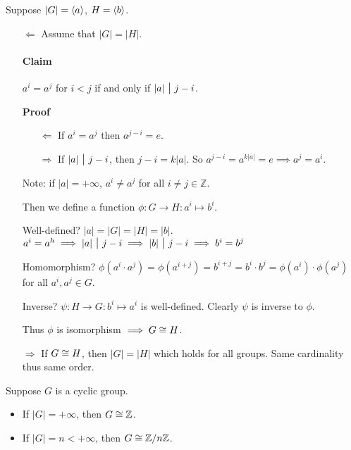\begin{pf}
Suppose $|G|=\left\langle a \right\rangle$, $H=\left\langle b \right\rangle$.

\begin{itemize}
\item[$\Leftarrow$] Assume that $|G|=|H|$.

\paragraph{Claim} $a^i=a^j$ for $i<j$ if and only if $|a|\midd j-i$.

\textbf{Proof}

\begin{itemize}
	\item[$\Leftarrow$] If $a^i = a^j$ then $a^{j-i}=e$.
	\item[$\Rightarrow$] If $|a|\midd j-i$, then $j-i=k|a|$. So $a^{j-i}=a^{k|a|}=e\implies a^j=a^i$. \claim
\end{itemize}

Note: if $|a|=+\infty$, $a^i\ne a^j$ for all $i\ne j\in \mathbb Z$.

Then we define a function $\phi: G\to H: a^i\mapsto b^i$.

Well-defined? $|a|=|G|=|H|=|b|$.
\\$a^i=a^h \implies |a|\midd j-i \implies |b| \midd j-i \implies b^i=b^j$

Homomorphism? $\phi(a^i\cdot a^j ) = \phi(a^{i+j}) = b^{i+j}=b^i\cdot b^j = \phi(a^i)\cdot \phi(a^j)$ for all $a^i,a^j\in G$.

Inverse? $\psi:H\to G: b^i\mapsto a^i$ is well-defined. Clearly $\psi$ is inverse to $\phi$.

Thus $\phi$ is isomorphism $\implies G\cong H$.

\item[$\Rightarrow$] If $G\cong H$, then $|G|=|H|$ which holds for all groups. Same cardinality thus same order.

\end{itemize}
\end{pf}

\begin{corr}
Suppose $G$ is a cyclic group.
\begin{itemize}
	\item If $|G|=+\infty$, then $G\cong \mathbb Z$.
	\item If $|G|=n<+\infty$, then $G\cong \mathbb Z/n\mathbb Z$.
\end{itemize}
\end{corr}


